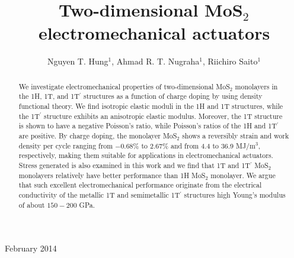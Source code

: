 \documentclass[12pt]{iopart}
\begin{document}
\title{Two-dimensional MoS$_2$ electromechanical actuators}


\author{Nguyen T. Hung$^1$, Ahmad R. T. Nugraha$^1$, Riichiro Saito$^1$}
\address{$^1$Department of Physics, Tohoku University, Sendai 980-8578, Japan}
\vspace{10pt}
\begin{indented}
\item[]February 2014
\end{indented}

\begin{abstract}
We investigate  electromechanical properties of two-dimensional MoS$_2$ monolayers in the 1H, 1T, and 1T$^\prime$ structures as a function of charge doping by using density functional theory. We find isotropic elastic moduli in the 1H and 1T structures, while the 1T$^\prime$ structure exhibits an anisotropic elastic modulus. Moreover, the 1T structure is shown to have a negative Poisson's ratio, while Poisson's ratios of the 1H and 1T$^\prime$ are positive. By charge doping, the monolayer MoS$_2$ shows a reversibly strain and work density per cycle ranging from $-0.68$\% to $2.67$\% and from 4.4 to 36.9 MJ/m$^3$, respectively, making them suitable for applications in electromechanical actuators. Stress generated is also examined in this work and we find that 1T and 1T$^\prime$ MoS$_2$ monolayers relatively have better performance than 1H MoS$_2$ monolayer. We argue that such excellent electromechanical performance originate from the electrical conductivity of the metallic 1T and semimetallic 1T$^\prime$ structures high Young's modulus of about $150-200$ GPa.
\end{abstract}

\maketitle
\end{document}
